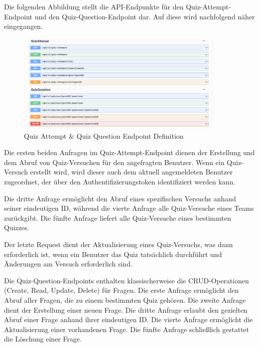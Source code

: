 
\noindent Die folgenden Abbildung stellt die API-Endpunkte für den Quiz-Attempt-Endpoint und den 
Quiz-Question-Endpoint dar. Auf diese wird nachfolgend näher eingegangen.

\begin{figure}[H]
  \centering
  \includegraphics[width=0.9\textwidth]{img/QuizAttempt_QuizQuestion-Endpoint.png}
  \caption{Quiz Attempt \& Quiz Question Endpoint Definition}
\end{figure}

\noindent Die ersten beiden Anfragen im Quiz-Attempt-Endpoint dienen der Erstellung und 
dem Abruf von Quiz-Versuchen für den angefragten Benutzer. Wenn ein Quiz-Versuch erstellt 
wird, wird dieser auch dem aktuell angemeldeten Benutzer zugeordnet, der über den 
Authentifizierungstoken identifiziert werden kann. \newline

\noindent Die dritte Anfrage ermöglicht den Abruf eines spezifischen Versuchs anhand seiner eindeutigen ID,
während die vierte Anfrage alle Quiz-Versuche eines Teams zurückgibt. Die fünfte Anfrage liefert alle 
Quiz-Versuche eines bestimmten Quizzes. \newline

\noindent Der letzte Request dient der Aktualisierung eines Quiz-Versuchs, was dann erforderlich ist,
 wenn ein Benutzer das Quiz tatsächlich durchführt und Änderungen am Versuch erforderlich sind. \newline

 \noindent Die Quiz-Question-Endpoints enthalten klassischerweise die CRUD-Operationen
(Create, Read, Update, Delete) für Fragen. Die erste Anfrage ermöglicht den Abruf aller Fragen, die zu einem 
bestimmten Quiz gehören. Die zweite Anfrage dient der Erstellung einer neuen Frage. Die dritte Anfrage 
erlaubt den gezielten Abruf einer Frage anhand ihrer eindeutigen ID. Die vierte Anfrage ermöglicht die 
Aktualisierung einer vorhandenen Frage. Die fünfte Anfrage schließlich gestattet die Löschung einer Frage.\newline

